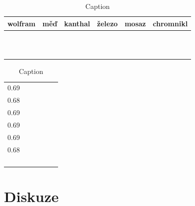 \documentclass{../concepts/prepareprotokol} %
\begin{document}
\begin{table}[!hbtp]
\centering
\caption{Změřené průměry drátů}
\begin{tabular}{cccccc}
 \toprule
 wolfram & měď & kanthal & železo & mosaz & chromnikl \\
 \midrule
 
& & & & & \\
 & & & & & \\
 & & & & & \\
 & & & & & \\
 & & & & & \\
 & & & & & \\
 & & & & & \\
 & & & & & \\
 & & & & & \\
 & & & & & \\
 
 \midrule

 & & & & & \\
 
 \bottomrule
\end{tabular}
\label{tab:prumer}

\begin{table}
    \centering
    \begin{tabular}{cccccc}
        0.69 &  &  &  &  & \\
        0.68 &  &  &  &  & \\
        0.69 &  &  &  &  & \\
        0.69 &  &  &  &  & \\
        0.69 &  &  &  &  & \\
        0.68 &  &  &  &  & \\
         &  &  &  &  & \\
         &  &  &  &  & \\
         &  &  &  &  & \\
         &  &  &  &  & \\
    \end{tabular}
    \caption{Caption}
    \label{tab:placeholder}
\end{table}
\end{table}


\section{Diskuze}


\end{document}
